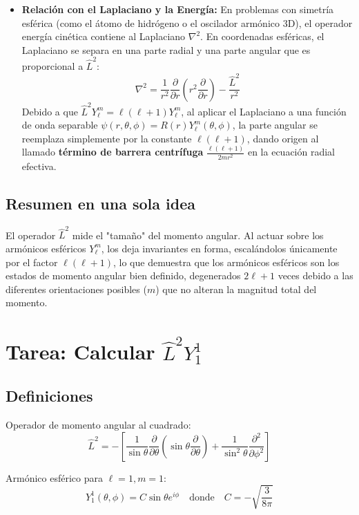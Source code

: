 \documentclass[a4paper]{article}
\begin{document}
\begin{itemize}
    \item \textbf{Relación con el Laplaciano y la Energía:} En problemas con simetría esférica (como el átomo de hidrógeno o el oscilador armónico 3D), el operador energía cinética contiene al Laplaciano $\nabla^2$. En coordenadas esféricas, el Laplaciano se separa en una parte radial y una parte angular que es proporcional a $\hat{L}^2$:
    $$\nabla^2 = \frac{1}{r^2} \frac{\partial}{\partial r} \left( r^2 \frac{\partial}{\partial r} \right) - \frac{\hat{L}^2}{r^2}$$
    Debido a que $\hat{L}^2 Y_\ell^m = \ell(\ell+1) Y_\ell^m$, al aplicar el Laplaciano a una función de onda separable $\psi(r, \theta, \phi) = R(r)Y_\ell^m(\theta, \phi)$, la parte angular se reemplaza simplemente por la constante $\ell(\ell+1)$, dando origen al llamado \textbf{término de barrera centrífuga} $\frac{\ell(\ell+1)}{2mr^2}$ en la ecuación radial efectiva.
\end{itemize}

\subsection{Resumen en una sola idea}

El operador $\hat{L}^2$ mide el "tamaño" del momento angular. Al actuar sobre los armónicos esféricos $Y_\ell^m$, los deja invariantes en forma, escalándolos únicamente por el factor $\ell(\ell+1)$, lo que demuestra que los armónicos esféricos son los estados de momento angular bien definido, degenerados $2\ell+1$ veces debido a las diferentes orientaciones posibles ($m$) que no alteran la magnitud total del momento.

\section{Tarea: Calcular $\hat{L}^2Y_1^1$}

\subsection{Definiciones}

Operador de momento angular al cuadrado:
$$ \hat{L}^2 = -\left[ \frac{1}{\sin\theta} \frac{\partial}{\partial\theta} \left( \sin\theta \frac{\partial}{\partial\theta} \right) + \frac{1}{\sin^2\theta} \frac{\partial^2}{\partial\phi^2} \right] $$

Armónico esférico para $\ell=1, m=1$:
$$ Y_1^1(\theta, \phi) = C \sin\theta e^{i\phi} \quad \text{donde} \quad C = -\sqrt{\frac{3}{8\pi}} $$
\end{document}
